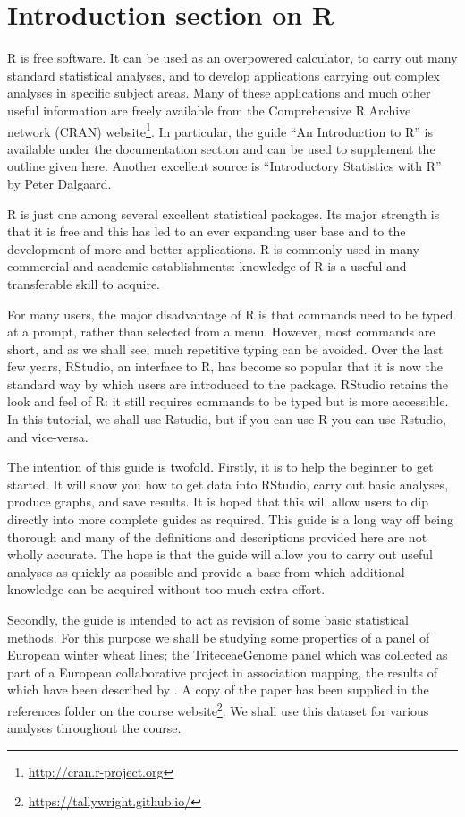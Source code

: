 \documentclass[
]{book}
\renewcommand{\href}[2]{#2\footnote{\url{#1}}}
\begin{document}
\hypertarget{introduction-section-on-r}{%
\section{Introduction section on R}\label{introduction-section-on-r}}

R is free software. It can be used as an overpowered calculator, to carry out many standard statistical analyses, and to develop applications carrying out complex analyses in specific subject areas. Many of these applications and much other useful information are freely available from the Comprehensive R Archive network (CRAN) \href{http://cran.r-project.org}{website}. In particular, the guide ``An Introduction to R'' is available under the documentation section and can be used to supplement the outline given here. Another excellent source is ``Introductory Statistics with R'' by Peter Dalgaard.

R is just one among several excellent statistical packages. Its major strength is that it is free and this has led to an ever expanding user base and to the development of more and better applications. R is commonly used in many commercial and academic establishments: knowledge of R is a useful and transferable skill to acquire.

For many users, the major disadvantage of R is that commands need to be typed at a prompt, rather than selected from a menu. However, most commands are short, and as we shall see, much repetitive typing can be avoided. Over the last few years, RStudio, an interface to R, has become so popular that it is now the standard way by which users are introduced to the package. RStudio retains the look and feel of R: it still requires commands to be typed but is more accessible. In this tutorial, we shall use Rstudio, but if you can use R you can use Rstudio, and vice-versa.

The intention of this guide is twofold. Firstly, it is to help the beginner to get started. It will show you how to get data into RStudio, carry out basic analyses, produce graphs, and save results. It is hoped that this will allow users to dip directly into more complete guides as required. This guide is a long way off being thorough and many of the definitions and descriptions provided here are not wholly accurate. The hope is that the guide will allow you to carry out useful analyses as quickly as possible and provide a base from which additional knowledge can be acquired without too much extra effort.

Secondly, the guide is intended to act as revision of some basic statistical methods. For this purpose we shall be studying some properties of a panel of European winter wheat lines; the TriteceaeGenome panel which was collected as part of a European collaborative project in association mapping, the results of which have been described by \citep{Bentley2014}. A copy of the paper has been supplied in the references folder on the course \href{https://tallywright.github.io/}{website}. We shall use this dataset for various analyses throughout the course.
\end{document}
